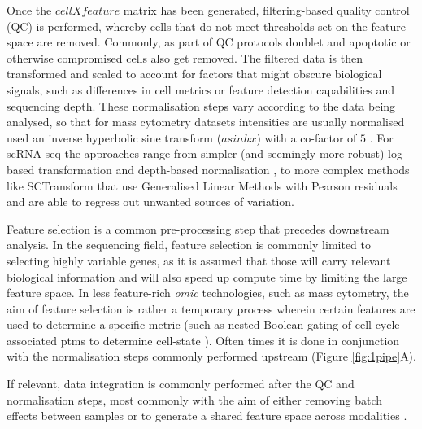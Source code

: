Once the $cell X feature$ matrix has been generated, filtering-based quality control (QC) is performed, whereby cells that do not meet thresholds set on the feature space are removed. Commonly, as part of QC protocols doublet and apoptotic or otherwise compromised cells also get removed.
The filtered data is then transformed and scaled to account for factors that might obscure biological signals, such as differences in cell metrics or feature detection capabilities and sequencing depth. These normalisation steps vary according to the data being analysed, so that for mass cytometry datasets intensities are usually normalised used an inverse hyperbolic sine transform (\(asinh x\)) with a co-factor of \(5\) \cite{bendall_single-cell_2011,guldberg_computational_2023}. For scRNA-seq the approaches range from simpler (and seemingly more robust) log-based transformation \cite{ahlmann-eltze_comparison_2023} and depth-based normalisation \cite{booeshaghi_depth_2022}, to more complex methods like SCTransform \cite{hafemeister_normalization_2019} that use Generalised Linear Methods with Pearson residuals and are able to regress out unwanted sources of variation.

Feature selection is a common pre-processing step that precedes downstream analysis. In the sequencing field, feature selection is commonly limited to selecting highly variable genes, as it is assumed that those will carry relevant biological information and will also speed up compute time by limiting the large feature space. In less feature-rich \emph{omic} technologies, such as mass cytometry, the aim of feature selection is rather a temporary process wherein certain features are used to determine a specific metric (such as nested Boolean gating of cell-cycle associated \acrshort{ptm}s to determine cell-state \cite{behbehani_single-cell_2012,qin_cell-type-specific_2020}). Often times it is done in conjunction with the normalisation steps commonly performed upstream (Figure \ref{fig:1pipe}A).

If relevant, data integration is commonly performed after the QC and normalisation steps, most commonly with the aim of either removing batch effects between samples or to generate a shared feature space across modalities \cite{cao_multi-omics_2022}. 

